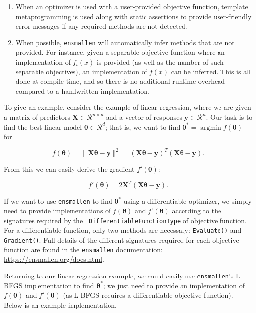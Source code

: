 \begin{enumerate}
  \item When an optimizer is used with a user-provided objective function,
template metaprogramming is used along with static assertions to provide
user-friendly error messages if any required methods are not detected.

  \item When possible, {\tt ensmallen} will automatically infer methods that are
not provided.  For instance, given a separable objective function where an
implementation of $f_i(x)$ is provided (as well as the number of such separable
objectives), an implementation of $f(x)$ can be inferred.  This is all done at
compile-time, and so there is no additional runtime overhead compared to a
handwritten implementation.
\end{enumerate}

To give an example, consider the example of linear regression, where we are
given a matrix of predictors $\bm X \in \mathcal{R}^{n \times d}$ and a vector
of responses $\bm y \in \mathcal{R}^n$.  Our task is to find the best linear
model $\bm \theta \in \mathcal{R}^d$; that is, we want to find $\bm \theta^* =
\operatorname{argmin} f(\bm \theta)$ for

\begin{equation}
f(\bm \theta) = \| \bm X \bm \theta - \bm y \|^2 = (\bm X \bm \theta - \bm y)^T
(\bm X \bm \theta - \bm y).
\label{eqn:obj_lr}
\end{equation}

From this we can easily derive the gradient $f'(\bm \theta)$:

\begin{equation}
f'(\bm \theta) = 2 \bm X^T (\bm X \bm \theta - \bm y).
\label{eqn:grad_lr}
\end{equation}

If we want to use {\tt ensmallen} to find $\bm \theta^*$ using a differentiable
optimizer, we simply need to provide implementations of $f(\bm \theta)$ and
$f'(\bm \theta)$ according to the signatures required by the {\tt
DifferentiableFunctionType} of objective function.  For a differentiable
function, only two methods are necessary: {\tt Evaluate()} and {\tt Gradient()}.
Full details of the different signatures required for each objective function
are found in the {\tt ensmallen} documentation:
\url{https://ensmallen.org/docs.html}.

Returning to our linear regression example, we could easily use {\tt ensmallen}'s
L-BFGS implementation to find $\bm \theta^*$; we just need to provide an
implementation of $f(\bm \theta)$ and $f'(\bm \theta)$ (as L-BFGS requires a
differentiable objective function).  Below is an example implementation.

